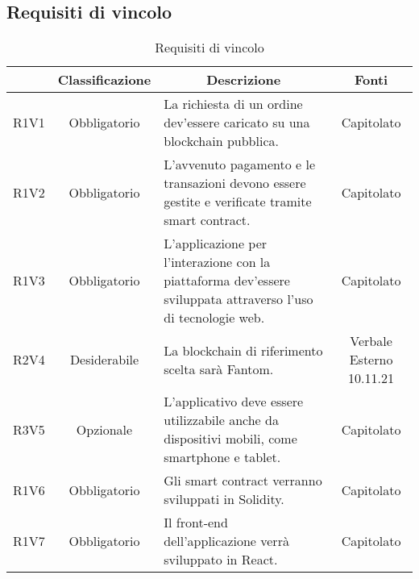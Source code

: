 \subsection{Requisiti di vincolo} \label{subsection:requisiti_vincolo}
\begin{table}[H]
    \centering
    \renewcommand{\arraystretch}{1.8}
    \begin{tabular}{c | c | p{6cm} | c}
        \rowcolor[HTML]{125E28}
        \multicolumn{1}{c}{\color[HTML]{FFFFFF} \textbf{Codice}}          &
        \multicolumn{1}{c}{\color[HTML]{FFFFFF} \textbf{Classificazione}} &
        \multicolumn{1}{c}{\color[HTML]{FFFFFF} \textbf{Descrizione}}     &
        \multicolumn{1}{c}{\color[HTML]{FFFFFF} \textbf{Fonti}}                                                                                                                                                                     \\
        \hline
        R1V1                                                              & Obbligatorio & La richiesta di un ordine dev'essere caricato su una blockchain\glo{} pubblica.                               & Capitolato               \\
        R1V2                                                              & Obbligatorio & L'avvenuto pagamento e le transazioni devono essere gestite e verificate tramite smart contract\glo{}.        & Capitolato               \\
        R1V3                                                              & Obbligatorio & L'applicazione per l'interazione con la piattaforma dev'essere sviluppata attraverso l'uso di tecnologie web. & Capitolato               \\
        R2V4                                                              & Desiderabile & La blockchain\glo{} di riferimento scelta sarà Fantom\glo{}.                                                  & Verbale Esterno 10.11.21 \\
        R3V5                                                              & Opzionale    & L'applicativo deve essere utilizzabile anche da dispositivi mobili, come smartphone e tablet.                 & Capitolato               \\
        R1V6                                                              & Obbligatorio & Gli smart contract\glo{} verranno sviluppati in Solidity\glo{}.                                               & Capitolato               \\
        R1V7                                                              & Obbligatorio & Il front-end\glo{} dell'applicazione verrà sviluppato in React\glo{}.                                         & Capitolato               \\
    \end{tabular}
    \caption{Requisiti di vincolo}
\end{table}

